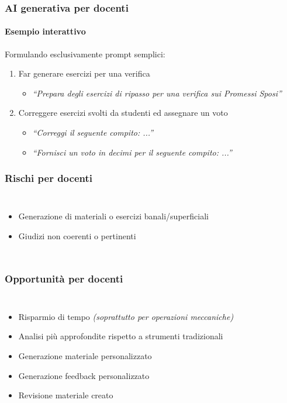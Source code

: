 \begin{exerciseframe}
    \frametitle{AI generativa per docenti}
    \framesubtitle{Esempio interattivo}

    Formulando esclusivamente prompt semplici:
    \begin{enumerate}
        \item Far generare esercizi per una verifica
        \begin{itemize}
            \item \textit{``Prepara degli esercizi di ripasso per una verifica sui Promessi Sposi''}
        \end{itemize}

        \pause
        \bigskip
        \item Correggere esercizi svolti da studenti ed assegnare un voto
        \begin{itemize}
            \item \textit{``Correggi il seguente compito: ...''}
            \item \textit{``Fornisci un voto in decimi per il seguente compito: ...''}
        \end{itemize}
    \end{enumerate}
\end{exerciseframe}

\begin{contentframe}
    \frametitle{Rischi per docenti}

    \begin{columns}
        \begin{itemize}
            \item Generazione di materiali o esercizi banali/superficiali
            \item Giudizi non coerenti o pertinenti
        \end{itemize}
    
        \centering
    \end{columns}
\end{contentframe}

\begin{contentframe}
    \frametitle{Opportunità per docenti}

    \begin{columns}
        \begin{itemize}
            \item Risparmio di tempo \textit{(soprattutto per operazioni meccaniche)}
            \item Analisi più approfondite rispetto a strumenti tradizionali
            \item Generazione materiale personalizzato
            \item Generazione feedback personalizzato
            \item Revisione materiale creato
        \end{itemize}
        
        \centering
    \end{columns}
\end{contentframe}


